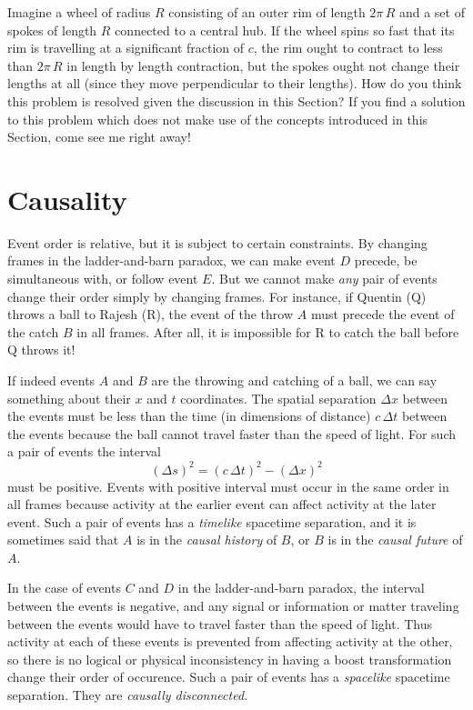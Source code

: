 \begin{problem}
Imagine a wheel of radius $R$ consisting of an outer rim of length
$2\pi\,R$ and a set of spokes of length $R$ connected to a central
hub.  If the wheel spins so fast that its rim is travelling at a
significant fraction of $c$, the rim ought to contract to less than
$2\pi\,R$ in length by length contraction, but the spokes ought not
change their lengths at all (since they move perpendicular to their
lengths).  How do you think this problem is resolved given the
discussion in this Section?  If you find a solution to this problem
which does not make use of the concepts introduced in this Section,
come see me right away!
\end{problem}


\section{Causality}
\label{sec:causality}

Event order is relative, but it is subject to certain constraints.  By
changing frames in the ladder-and-barn paradox, we can make event $D$
precede, be simultaneous with, or follow event $E$.  But we cannot
make {\em any\/} pair of events change their order simply by changing
frames.  For instance, if Quentin (Q) throws a ball to Rajesh (R), the
event of the throw $A$ must precede the event of the catch $B$ in all
frames.  After all, it is impossible for R to catch the ball before Q
throws it!

If indeed events $A$ and $B$ are the throwing and catching of a ball,
we can say something about their $x$ and $t$ coordinates.  The spatial
separation $\Delta x$ between the events must be less than the time
(in dimensions of distance) $c\,\Delta t$ between the events because
the ball cannot travel faster than the speed of light.  For such a
pair of events the interval
\begin{equation}
(\Delta s)^2 = (c\,\Delta t)^2 - (\Delta x)^2
\end{equation}
must be positive.  Events with positive interval must occur in the
same order in all frames because activity at the earlier event can
affect activity at the later event.  Such a pair of events has a {\em
timelike\/} spacetime separation, and it is sometimes said that $A$ is
in the {\em causal history\/} of $B$, or $B$ is in the {\em causal
future\/} of $A$.

In the case of events $C$ and $D$ in the ladder-and-barn paradox, the
interval between the events is negative, and any signal or information
or matter traveling between the events would have to travel faster
than the speed of light.  Thus activity at each of these events is
prevented from affecting activity at the other, so there is no logical
or physical inconsistency in having a boost transformation change
their order of occurence.  Such a pair of events has a {\em
spacelike\/} spacetime separation.  They are {\em causally
disconnected.\/}

